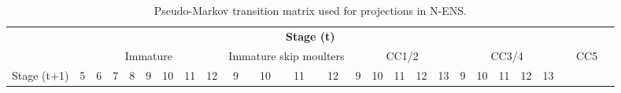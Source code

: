 \documentclass[11pt]{article}
\begin{document}
\begin{landscape}

\begin{table}[!tbp]
 \caption{Pseudo-Markov transition matrix used for projections in N-ENS.\label{tm.nens}} 
 \begin{center}
\begin{scriptsize}
 \begin{tabular}{llllllllllllllllllllllllllll}\hline\hline
\multicolumn{28}{c}{\bfseries Stage (t)}
\\ 
\multicolumn{1}{c}{ }&
\multicolumn{8}{c}{Immature}&
\multicolumn{4}{c}{Immature skip moulters}&
\multicolumn{5}{c}{CC1/2}&
\multicolumn{5}{c}{CC3/4}&
\multicolumn{5}{c}{CC5}
\\
\multicolumn{1}{c}{Stage (t+1)}&
\multicolumn{1}{c}{5}&
\multicolumn{1}{c}{6}&
\multicolumn{1}{c}{7}&
\multicolumn{1}{c}{8}&
\multicolumn{1}{c}{9}&
\multicolumn{1}{c}{10}&
\multicolumn{1}{c}{11}&
\multicolumn{1}{c}{12}&
\multicolumn{1}{c}{9}&
\multicolumn{1}{c}{10}&
\multicolumn{1}{c}{11}&
\multicolumn{1}{c}{12}&
\multicolumn{1}{c}{9}&
\multicolumn{1}{c}{10}&
\multicolumn{1}{c}{11}&
\multicolumn{1}{c}{12}&
\multicolumn{1}{c}{13}&
\multicolumn{1}{c}{9}&
\multicolumn{1}{c}{10}&
\multicolumn{1}{c}{11}&
\multicolumn{1}{c}{12}&
\multicolumn{1}{c}{13}
\\ \hline


\end{tabular}
\end{scriptsize}
\end{center}
\end{table}
\end{landscape}
\end{document}
